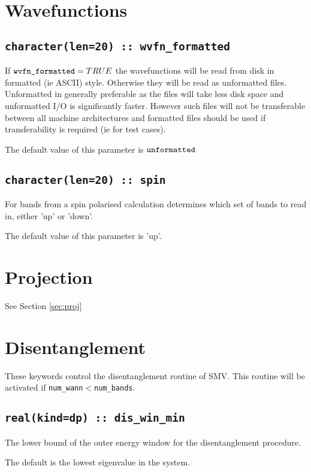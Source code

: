 \section{Wavefunctions}



\subsection[wvfn\_formated]{\tt character(len=20) :: wvfn\_formatted}

If $\verb#wvfn_formatted#=TRUE$ the wavefunctions will be read from disk
in formatted (ie ASCII) style. Otherwise they will be read as unformatted
files. Unformatted in generally preferable as the files will take less disk
space and unformatted I/O is significantly faster. However such files
will not be transferable between all machine architectures and formatted
files should be used if transferability is required (ie for test cases).

The default value of this parameter is $\verb#unformatted#$


\subsection[spin]{\tt character(len=20) :: spin}
For bands from a spin polarised calculation determines which set
of bands to read in, either 'up' or 'down'.

The default value of this parameter is 'up'.


\section{Projection}

See Section \ref{sec:proj}



\section{Disentanglement}
These keywords control the disentanglement routine of SMV. This routine
will be activated if \verb#num_wann#$<$\verb#num_bands#.


\subsection[dis\_win\_min]{\tt real(kind=dp) :: dis\_win\_min}
The lower bound of the outer energy window for the disentanglement
procedure.

The default is the lowest eigenvalue in the system.

